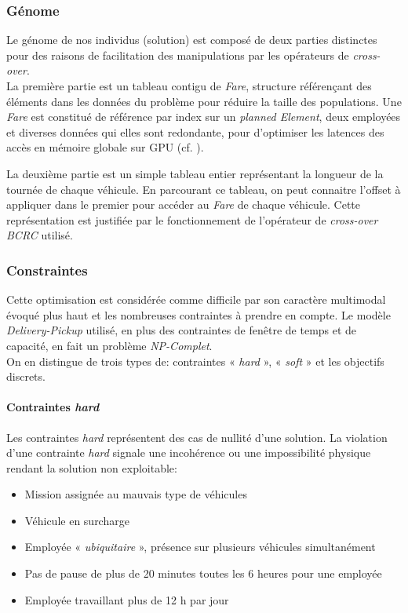 \documentclass[french, 11pt]{memoir}
\begin{document}
\subsubsection{Génome}\label{genome}
Le génome de nos individus
(solution) est composé de deux parties distinctes pour des raisons de
facilitation des manipulations par les opérateurs de \emph{cross-over}. \\
La première partie est un tableau contigu de \emph{Fare}, structure
référençant des éléments dans les données du problème pour réduire la
taille des populations. Une \emph{Fare} est constitué de référence par
index sur un \emph{planned Element}, deux employées et diverses données
qui elles sont redondante, pour d'optimiser les latences des accès en
mémoire globale sur GPU (cf. ).

\bigskip
La deuxième partie est un simple tableau entier représentant la longueur
de la tournée de chaque véhicule. En parcourant ce tableau, on peut
connaitre l'offset à appliquer dans le premier pour accéder au
\emph{Fare} de chaque véhicule. Cette représentation est justifiée par le fonctionnement de l'opérateur
de \emph{cross-over} \emph{BCRC} utilisé.


\subsubsection{Constraintes}\label{constraintes}

Cette optimisation est considérée comme difficile par son caractère
multimodal évoqué plus haut et les nombreuses contraintes à prendre en
compte. Le modèle \emph{Delivery-Pickup} utilisé, en plus des
contraintes de fenêtre de temps et de capacité, en fait un problème
\emph{NP-Complet}. \\
On en distingue de trois types de: contraintes « \emph{hard} », «
\emph{soft} » et les objectifs discrets.

\paragraph{Contraintes \emph{hard}}\label{contraintes-hard}
Les contraintes \emph{hard} représentent des cas de nullité d'une
solution. La violation d'une contrainte \emph{hard }signale une
incohérence ou une impossibilité physique rendant la solution non
exploitable:

\begin{itemize}
	\item
	Mission assignée au mauvais type de véhicules
	\item
	Véhicule en surcharge
	\item
	Employée « \emph{ubiquitaire} », présence sur plusieurs véhicules
	simultanément
	\item
	Pas de pause de plus de 20 minutes toutes les 6 heures pour une
	employée
	\item
	Employée travaillant plus de 12 h par jour
\end{itemize}
\end{document}
